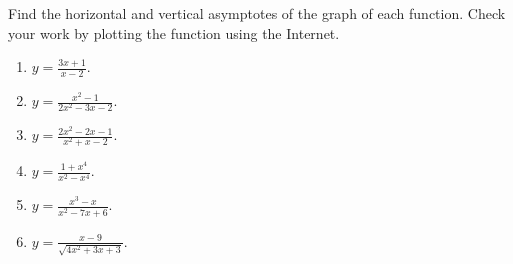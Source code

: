 Find the horizontal and vertical asymptotes of the graph of each function. Check your work by plotting the function using the Internet.
\begin{multicols}{2}
\begin{enumerate}
\item $\displaystyle y=\frac{3x+1}{x-2}$.

\item $\displaystyle y=\frac{x^2-1}{2x^2-3x-2}$.

\item $\displaystyle y=\frac{2x^2-2x-1}{x^2+x-2}$.

\item $\displaystyle y=\frac{1+x^4}{x^2-x^4}$.

\item $\displaystyle y=\frac{x^3-x}{x^2-7x+6}$.

\item $\displaystyle y=\frac{x-9}{\sqrt{4x^2+3x+3}}$.

\end{enumerate}
\end{multicols}